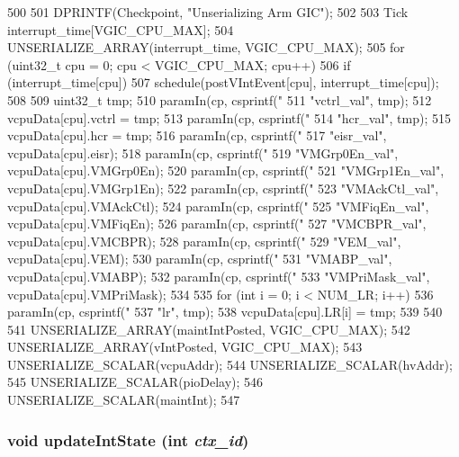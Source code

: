 \begin{DoxyCode}
500 {
501     DPRINTF(Checkpoint, "Unserializing Arm GIC\n");
502 
503     Tick interrupt_time[VGIC_CPU_MAX];
504     UNSERIALIZE_ARRAY(interrupt_time, VGIC_CPU_MAX);
505     for (uint32_t cpu = 0; cpu < VGIC_CPU_MAX; cpu++) {
506         if (interrupt_time[cpu])
507             schedule(postVIntEvent[cpu], interrupt_time[cpu]);
508 
509         uint32_t tmp;
510         paramIn(cp, csprintf("%
511                 "vctrl_val", tmp);
512         vcpuData[cpu].vctrl = tmp;
513         paramIn(cp, csprintf("%
514                 "hcr_val", tmp);
515         vcpuData[cpu].hcr = tmp;
516         paramIn(cp, csprintf("%
517                 "eisr_val", vcpuData[cpu].eisr);
518         paramIn(cp, csprintf("%
519                 "VMGrp0En_val", vcpuData[cpu].VMGrp0En);
520         paramIn(cp, csprintf("%
521                 "VMGrp1En_val", vcpuData[cpu].VMGrp1En);
522         paramIn(cp, csprintf("%
523                 "VMAckCtl_val", vcpuData[cpu].VMAckCtl);
524         paramIn(cp, csprintf("%
525                 "VMFiqEn_val", vcpuData[cpu].VMFiqEn);
526         paramIn(cp, csprintf("%
527                 "VMCBPR_val", vcpuData[cpu].VMCBPR);
528         paramIn(cp, csprintf("%
529                 "VEM_val", vcpuData[cpu].VEM);
530         paramIn(cp, csprintf("%
531                 "VMABP_val", vcpuData[cpu].VMABP);
532         paramIn(cp, csprintf("%
533                 "VMPriMask_val", vcpuData[cpu].VMPriMask);
534 
535         for (int i = 0; i < NUM_LR; i++) {
536             paramIn(cp, csprintf("%
537                     "lr", tmp);
538             vcpuData[cpu].LR[i] = tmp;
539         }
540     }
541     UNSERIALIZE_ARRAY(maintIntPosted, VGIC_CPU_MAX);
542     UNSERIALIZE_ARRAY(vIntPosted, VGIC_CPU_MAX);
543     UNSERIALIZE_SCALAR(vcpuAddr);
544     UNSERIALIZE_SCALAR(hvAddr);
545     UNSERIALIZE_SCALAR(pioDelay);
546     UNSERIALIZE_SCALAR(maintInt);
547 }
\end{DoxyCode}
\hypertarget{classVGic_aa1847a7ae392ebc8637b9ab5d25c4c4b}{
\subsubsection[{updateIntState}]{\setlength{\rightskip}{0pt plus 5cm}void updateIntState (int {\em ctx\_\-id})}}
\label{classVGic_aa1847a7ae392ebc8637b9ab5d25c4c4b}



